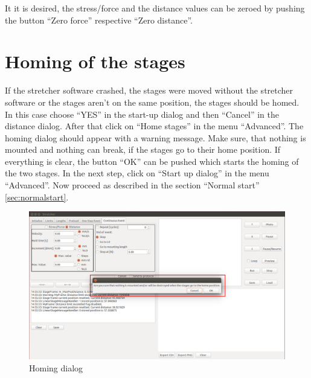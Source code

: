 It it is desired, the stress/force and the distance values can be zeroed by pushing the button ``Zero force'' respective ``Zero distance''.

\section{Homing of the stages}
If the stretcher software crashed, the stages were moved without the stretcher software or the stages aren't on the same position, the stages should be homed. In this case choose ``YES'' in the start-up dialog and then ``Cancel'' in the distance dialog. After that click on ``Home stages'' in the menu ``Advanced''. The homing dialog should appear with a warning message. Make sure, that nothing is mounted and nothing can break, if the stages go to their home position. If everything is clear, the button ``OK'' can be pushed which starts the homing of the two stages. In the next step, click on ``Start up dialog'' in the menu ``Advanced''. Now proceed as described in the section ``Normal start'' \ref{sec:normalstart}.

\begin{figure}[!ht]
	\centering
		\includegraphics[width=1.0\textwidth]{images/HomeStages}
	\caption{Homing dialog}
	\label{fig:homeing}
\end{figure}
